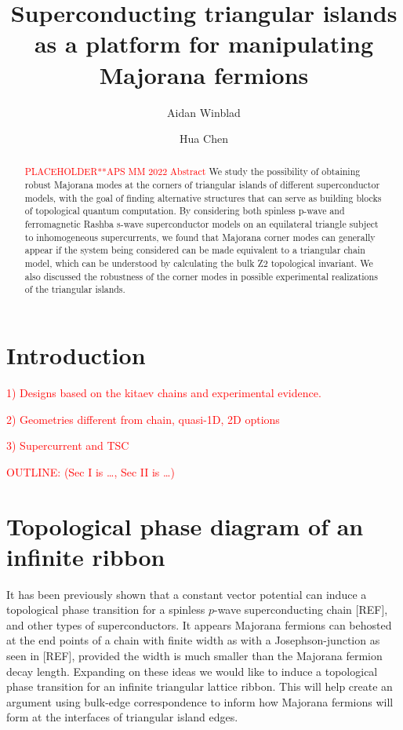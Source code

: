 \documentclass[aps,prb,showpacs,amsmath,amssymb,superscriptaddress]{revtex4-2}
\newcommand{\Red}[1]{\textcolor{red}{#1}}
\begin{document}
\title{Superconducting triangular islands as a platform for manipulating Majorana fermions}

\author{Aidan Winblad}

\author{Hua Chen}

\maketitle

\begin{abstract}
  \Red{PLACEHOLDER**APS MM 2022 Abstract}
  We study the possibility of obtaining robust Majorana modes at the corners of triangular islands of different superconductor models, with the goal of finding alternative structures that can serve as building blocks of topological quantum computation.
  By considering both spinless p-wave and ferromagnetic Rashba s-wave superconductor models on an equilateral triangle subject to inhomogeneous supercurrents, we found that Majorana corner modes can generally appear if the system being considered can be made equivalent to a triangular chain model, which can be understood by calculating the bulk Z2 topological invariant.
  We also discussed the robustness of the corner modes in possible experimental realizations of the triangular islands.
\end{abstract}


\section{Introduction}
\Red{1) Designs based on the kitaev chains and experimental evidence.}

\Red{2) Geometries different from chain, quasi-1D, 2D options}

\Red{3) Supercurrent and TSC}

\Red{OUTLINE: (Sec I is \dots, Sec II is \dots)}
\section{Topological phase diagram of an infinite ribbon}

It has been previously shown that a constant vector potential can induce a topological phase transition for a spinless $p$-wave superconducting chain [REF], and other types of superconductors.
It appears Majorana fermions can behosted at the end points of a chain with finite width as with a Josephson-junction as seen in [REF], provided the width is much smaller than the Majorana fermion decay length.
Expanding on these ideas we would like to induce a topological phase transition for an infinite triangular lattice ribbon.
This will help create an argument using bulk-edge correspondence to inform how Majorana fermions will form at the interfaces of triangular island edges.
\end{document}
